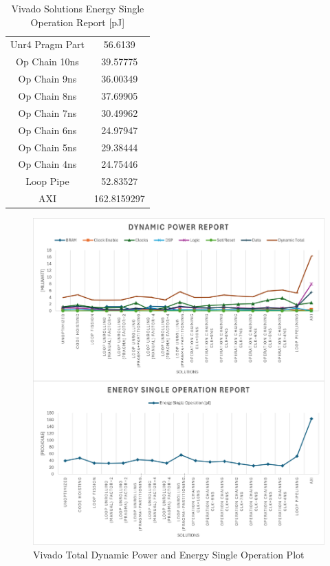 \begin{table}[H]
\begin{minipage}[t]{0.45\linewidth}
\begin{tabular}{|c|c|}
			Unr4 Pragm Part & 56.6139 \\
			Op Chain 10ns & 39.57775 \\
			Op Chain 9ns & 36.00349 \\
			Op Chain 8ns & 37.69905 \\
			Op Chain 7ns & 30.49962 \\
			Op Chain 6ns & 24.97947 \\
			Op Chain 5ns & 29.38444 \\
			Op Chain 4ns & 24.75446 \\
			Loop Pipe & 52.83527 \\
			AXI & 162.8159297 \\
			\hline
		\end{tabular}
		\caption{Vivado Solutions Energy Single Operation Report [pJ]}
		\label{tab:vivado-solutions-energy-single-operation-report}
	\end{minipage}
\end{table}

\begin{figure}[H]
	\centering
	\includegraphics[width=0.7\textheight]{conclusions/powerreport.png}
	\caption{Vivado Total Dynamic Power and Energy Single Operation Plot}
	\label{fig:vivado-solutions-power-plot}
\end{figure}

